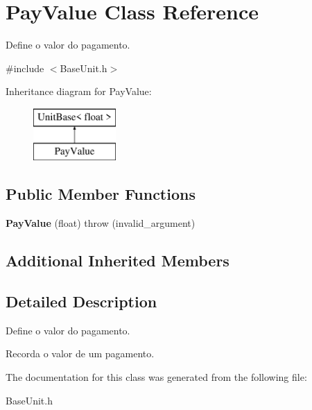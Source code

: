 \hypertarget{classPayValue}{\section{Pay\-Value Class Reference}
\label{classPayValue}
}


Define o valor do pagamento.  




{\ttfamily \#include $<$Base\-Unit.\-h$>$}

Inheritance diagram for Pay\-Value\-:\begin{figure}[H]
\begin{center}
\leavevmode
\includegraphics[height=2.000000cm]{classPayValue}
\end{center}
\end{figure}
\subsection*{Public Member Functions}
\begin{DoxyCompactItemize}
\item 
\hypertarget{classPayValue_a94fd7f5521beb8a47dbd34e6e0671a11}{{\bfseries Pay\-Value} (float)  throw (invalid\-\_\-argument)}\label{classPayValue_a94fd7f5521beb8a47dbd34e6e0671a11}

\end{DoxyCompactItemize}
\subsection*{Additional Inherited Members}


\subsection{Detailed Description}
Define o valor do pagamento. 

Recorda o valor de um pagamento. 

The documentation for this class was generated from the following file\-:\begin{DoxyCompactItemize}
\item 
Base\-Unit.\-h\end{DoxyCompactItemize}

